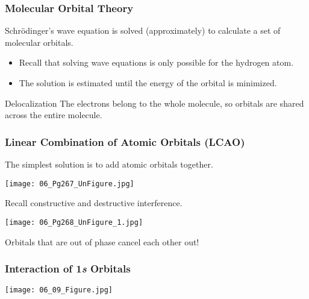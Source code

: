 \documentclass[notes=only]{beamer}
\begin{document}
\begin{frame}[t]
	\frametitle{Molecular Orbital Theory}
	Schrödinger's wave equation is solved (approximately) to calculate a set
	of \alert{molecular} orbitals.
	\begin{itemize}[<+->]
		\item Recall that solving wave equations is only possible for
			the hydrogen atom.
		\item The solution is estimated until the energy of the orbital
			is \alert{minimized}.
	\end{itemize}

	\onslide<+->
	\bigskip

	\begin{block}{Delocalization}
		The electrons belong to the \alert{whole} molecule, so orbitals
		are shared across the \alert{entire} molecule.
	\end{block}
\end{frame}

\begin{frame}[t]
	\frametitle{Linear Combination of Atomic Orbitals (LCAO)}
	The \alert{simplest} solution is to add atomic orbitals together.
	\begin{center}
		\texttt{[image: 06\_Pg267\_UnFigure.jpg]}
	\end{center}

	\pause

	Recall \alert{constructive} and \alert{destructive} interference.
	\begin{center}
		\texttt{[image: 06\_Pg268\_UnFigure\_1.jpg]}
	\end{center}
	Orbitals that are out of phase cancel each other out!
\end{frame}

\begin{frame}[c]
	\frametitle{Interaction of 1\textit{s} Orbitals}
	\begin{center}
		\texttt{[image: 06\_09\_Figure.jpg]}
	\end{center}
\end{frame}
\end{document}
